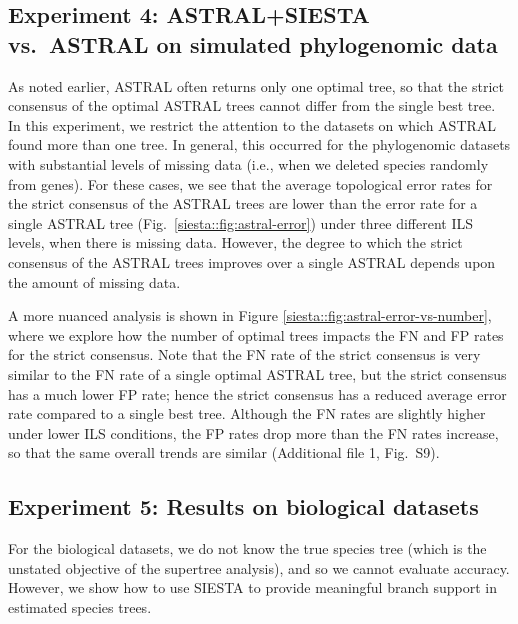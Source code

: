 \subsection{Experiment 4: ASTRAL+SIESTA vs.~ASTRAL on simulated phylogenomic data}


As noted earlier, ASTRAL often returns only one optimal tree, so that the strict consensus of the optimal ASTRAL trees cannot differ from the single best tree. 
In this experiment, we restrict the attention to the datasets on which ASTRAL found more than one tree.
In general, this occurred for the phylogenomic datasets with substantial levels of missing data (i.e., when we deleted species randomly from genes). 
For these cases, we see that the average topological error rates  for the strict consensus of the ASTRAL trees  are lower than the error rate for a single ASTRAL tree (Fig.~\ref{siesta::fig:astral-error}) under three different ILS levels, when there is missing data. However, the degree to which the strict consensus of the ASTRAL  trees improves over a single ASTRAL depends upon the amount of missing data.

A more nuanced analysis is shown in  Figure \ref{siesta::fig:astral-error-vs-number}, where we explore how
the number of optimal trees impacts the FN and FP rates for the strict consensus.
Note that the FN rate of the strict consensus is very similar to the FN rate of a single optimal ASTRAL tree, but the strict consensus has a much lower FP rate;
hence the  strict consensus has a reduced  average  error rate compared to a single best tree.
Although  the FN rates are slightly higher under lower ILS conditions, the FP rates drop more than the  FN rates increase, so that the same overall trends are  similar  (Additional file 1, Fig.~S9). %
 



\subsection{Experiment 5: Results on biological datasets}



For the biological datasets,  we do not know the true species tree (which is the unstated objective of the supertree analysis), and so we cannot evaluate accuracy. 
However, we show how to use SIESTA to provide meaningful branch support in estimated species trees.


